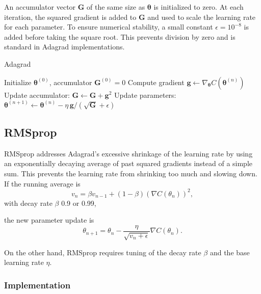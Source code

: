 \documentclass[
 reprint,            %
 amsmath,amssymb,
 aps,
]{revtex4-2}
\begin{document}
An accumulator vector $\mathbf{G}$ of the same size as $\boldsymbol{\theta}$ is initialized to zero. At each iteration, the squared gradient is added to $\mathbf{G}$ and used to scale the learning rate for each parameter.
To ensure numerical stability, a small constant $\epsilon=10^{-8}$ is added before taking the square root. This prevents division by zero and is standard in Adagrad implementations.
\begin{algorithm}[H]
\caption{Adagrad}
\begin{algorithmic}[1]
\State Initialize $\boldsymbol{\theta}^{(0)}$, accumulator $\mathbf{G}^{(0)}=0$
\State Compute gradient $\mathbf{g} \gets \nabla_{\boldsymbol{\theta}} C(\boldsymbol{\theta}^{(n)})$
\State Update accumulator: $\mathbf{G} \gets \mathbf{G} + \mathbf{g}^2$
\State Update parameters: $\boldsymbol{\theta}^{(n+1)} \gets \boldsymbol{\theta}^{(n)} - \eta \, \mathbf{g} / (\sqrt{\mathbf{G}}+\epsilon)$
\EndFor
\end{algorithmic}
\end{algorithm}

\subsection{RMSprop}

RMSprop addresses Adagrad's excessive shrinkage of the learning rate by using an exponentially decaying average of past squared gradients instead of a simple sum\cite{hjorthjensen_week37}.
This prevents the learning rate from shrinking too much and slowing down.  
If the running average is
\[
v_n = \beta v_{n-1} + (1 - \beta)\left( \nabla C(\theta_n) \right)^2,
\]
with decay rate \(\beta\) 0.9 or 0.99,

the new parameter update is
\[\theta_{n+1} = \theta_n - \frac{\eta}{\sqrt{v_n + \epsilon}} \nabla C(\theta_n).
\]

On the other hand, RMSprop requires tuning of the decay rate \(\beta\) and the base learning rate \(\eta\). \cite{goodfellow2016}

\subsubsection{Implementation}
\end{document}
